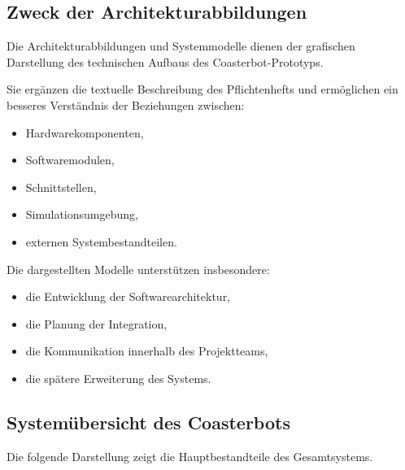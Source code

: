 \documentclass[
  a4paper,
  12pt,
  DIV=12,        %
  parskip=half,  %
  headings=small %
]{scrartcl}
\theoremstyle{definition}
\providecommand{\tightlist}{%
  \setlength{\itemsep}{0pt}\setlength{\parskip}{0pt}}
\theoremstyle{definition}
\begin{document}
\subsection{Zweck der
Architekturabbildungen}\label{zweck-der-architekturabbildungen}

Die Architekturabbildungen und Systemmodelle dienen der grafischen
Darstellung des technischen Aufbaus des Coasterbot-Prototyps.

Sie ergänzen die textuelle Beschreibung des Pflichtenhefts und
ermöglichen ein besseres Verständnis der Beziehungen zwischen:

\begin{itemize}
\tightlist
\item
  Hardwarekomponenten,
\item
  Softwaremodulen,
\item
  Schnittstellen,
\item
  Simulationsumgebung,
\item
  externen Systembestandteilen.
\end{itemize}

Die dargestellten Modelle unterstützen insbesondere:

\begin{itemize}
\tightlist
\item
  die Entwicklung der Softwarearchitektur,
\item
  die Planung der Integration,
\item
  die Kommunikation innerhalb des Projektteams,
\item
  die spätere Erweiterung des Systems.
\end{itemize}

\subsection{Systemübersicht des
Coasterbots}\label{systemuxfcbersicht-des-coasterbots}

Die folgende Darstellung zeigt die Hauptbestandteile des Gesamtsystems.
\end{document}

